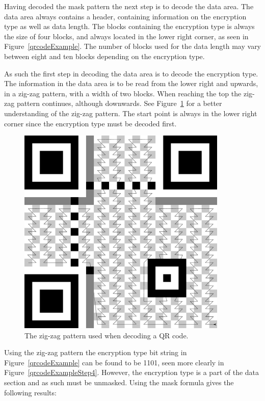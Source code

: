 Having decoded the mask pattern the next step is to decode the data area. The data area always contains a header, containing information on the encryption type as well as data length. The blocks containing the encryption type is always the size of four blocks, and always located in the lower right corner, as seen in Figure~\ref{qrcodeExample}. The number of blocks used for the data length may vary between eight and ten blocks depending on the encryption type.

As such the first step in decoding the data area is to decode the encryption type. The information in the data area is to be read from the lower right and upwards, in a zig-zag pattern, with a width of two blocks. When reaching the top the zig-zag pattern continues, although downwards. See Figure~\ref{qrcodezigzag} for a better understanding of the zig-zag pattern. The start point is always in the lower right corner since the encryption type must be decoded first.

	\begin{figure}[H]%
		\centering
		\includegraphics[width=100mm]{images/qrcodezigzag}
		\caption{The zig-zag pattern used when decoding a QR code.}
		\label{qrcodezigzag}
	\end{figure}

Using the zig-zag pattern the encryption type bit string in Figure~\ref{qrcodeExample} can be found to be 1101, seen more clearly in Figure~\ref{qrcodeExampleStep4}. However, the encryption type is a part of the data section and as such must be unmasked. Using the mask formula gives the following results:

